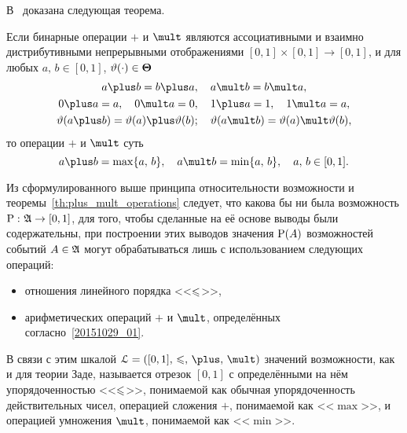 В~\cite{possbook, possbook2} доказана следующая теорема.
\begin{theorem}
\label{th:plus_mult_operations}
Если бинарные операции $\plus$ и $\mult$ являются ассоциативными и взаимно дистрибутивными непрерывными отображениями $[0,1]\times[0,1]\to[0,1]$, и для любых $a,\, b\in[0,1]$, $\vtheta(\cdot)\in\bTheta$
\begin{gather*}
    a\plus b = b\plus a, \quad a\mult b = b\mult a,\\
    0\plus a = a, \quad 0\mult a = 0, \quad 1\plus a = 1, \quad 1\mult a = a,\\
    \vtheta(a\plus b) = \vtheta(a) \plus \vtheta(b); \quad \vtheta(a\mult b) = \vtheta(a) \mult \vtheta(b),
\end{gather*}
то операции $\plus$ и $\mult$ суть
\begin{equation}
\label{20151029_01}
    a \plus b = \max\{a,\, b\}, \quad a \mult b = \min\{a,\, b\}, \quad a,\,b \in [0,1].
\end{equation}
\end{theorem}

Из сформулированного выше принципа относительности возможности и теоремы~\ref{th:plus_mult_operations} следует, что какова бы ни была возможность ${\P:}\ {\Alg\to[0,1]}$, для того, чтобы сделанные на её основе выводы были содержательны, при построении этих выводов значения $\P(A)$ возможностей событий $A\in\Alg$ могут обрабатываться лишь с использованием следующих операций:
\begin{itemize}
\item
    отношения линейного порядка <<$\leqs$>>,
\item
    арифметических операций $\plus$ и $\mult$, определённых согласно~\eqref{20151029_01}.
\end{itemize}

В связи с этим шкалой $\scL = \scale$ значений возможности, как и для теории Заде, называется отрезок $[0,1]$ с определёнными на нём упорядоченностью <<$\leqs$>>, понимаемой как обычная упорядоченность действительных чисел, операцией сложения $\plus$, понимаемой как <<$\max$>>, и операцией умножения $\mult$, понимаемой как <<$\min$>>.
\begin{comment}
Пусть ${\{a_1,\, a_2,\, \ldots\}\subset\scL}$~--- последовательность элементов $\scL$. Нижний $\liminf\limits_{i\to\infty} a_i$ и верхний $\limsup\limits_{i\to\infty} a_i$ пределы этой последовательности определяют следующим образом:
\begin{gather*}
    \dst\liminf_{i\to\infty} a_i = \sup_{n=1,\, 2,\, \ldots}\inf_{i\geqs n}a_i,\\
    \dst\limsup_{i\to\infty} a_i = \inf_{n=1,\, 2,\, \ldots}\sup_{i\geqs n}a_i.
\end{gather*}
Если $\liminf\limits_{i\to\infty} a_i = \limsup\limits_{i\to\infty} a_i$, последовательность $\{a_1,\, a_2,\, \ldots\}$ называется сходящейся, а её пределом называется элемент
$$\lim_{i\to\infty} a_i \defeq \liminf_{i\to\infty} a_i = \limsup_{i\to\infty} a_i.$$
\end{comment}

